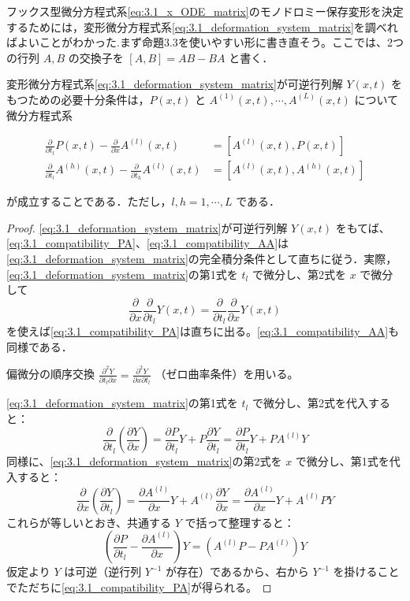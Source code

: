 \begin{story}
フックス型微分方程式系\eqref{eq:3.1_x_ODE_matrix}のモノドロミー保存変形を決定するためには，変形微分方程式系\eqref{eq:3.1_deformation_system_matrix}を調べればよいことがわかった.まず命題3.3を使いやすい形に書き直そう。ここでは、2つの行列 $A, B$ の交換子を $[A, B] = AB - BA$ と書く．

\begin{proposition}\label{prop:3.1_compatibility}
変形微分方程式系\eqref{eq:3.1_deformation_system_matrix}が可逆行列解 $Y(x,t)$ をもつための必要十分条件は，$P(x,t)$ と $A^{(1)}(x,t), \cdots, A^{(L)}(x,t)$ について微分方程式系

\begin{align}
  \frac{\partial}{\partial t_l}P(x,t) - \frac{\partial}{\partial x}A^{(l)}(x,t) &= \left[ A^{(l)}(x,t), P(x,t) \right] \label{eq:3.1_compatibility_PA}\\
  \frac{\partial}{\partial t_l}A^{(h)}(x,t) - \frac{\partial}{\partial t_h}A^{(l)}(x,t) &= \left[ A^{(l)}(x,t), A^{(h)}(x,t) \right] \label{eq:3.1_compatibility_AA}
\end{align}

が成立することである．ただし，$l,h=1,\cdots,L$ である．
\end{proposition}

\begin{proof}
\eqref{eq:3.1_deformation_system_matrix}が可逆行列解 $Y(x,t)$ をもてば、\eqref{eq:3.1_compatibility_PA}、\eqref{eq:3.1_compatibility_AA}は\eqref{eq:3.1_deformation_system_matrix}の完全積分条件として直ちに従う．実際，\eqref{eq:3.1_deformation_system_matrix}の第1式を $t_l$ で微分し、第2式を $x$ で微分して
\[
  \frac{\partial}{\partial x}\frac{\partial}{\partial t_l}Y(x,t) = \frac{\partial}{\partial t_l}\frac{\partial}{\partial x}Y(x,t)
\]
を使えば\eqref{eq:3.1_compatibility_PA}は直ちに出る。\eqref{eq:3.1_compatibility_AA}も同様である．

偏微分の順序交換 $\frac{\partial^2 Y}{\partial t_l \partial x} = \frac{\partial^2 Y}{\partial x \partial t_l}$ （ゼロ曲率条件）を用いる。

\eqref{eq:3.1_deformation_system_matrix}の第1式を $t_l$ で微分し、第2式を代入すると：
\[
  \frac{\partial}{\partial t_l}\left(\frac{\partial Y}{\partial x}\right) 
  = \frac{\partial P}{\partial t_l}Y + P\frac{\partial Y}{\partial t_l} 
  = \frac{\partial P}{\partial t_l}Y + P A^{(l)}Y
\]
同様に、\eqref{eq:3.1_deformation_system_matrix}の第2式を $x$ で微分し、第1式を代入すると：
\[
  \frac{\partial}{\partial x}\left(\frac{\partial Y}{\partial t_l}\right) 
  = \frac{\partial A^{(l)}}{\partial x}Y + A^{(l)}\frac{\partial Y}{\partial x} 
  = \frac{\partial A^{(l)}}{\partial x}Y + A^{(l)} P Y
\]
これらが等しいとおき、共通する $Y$ で括って整理すると：
\[
  \left( \frac{\partial P}{\partial t_l} - \frac{\partial A^{(l)}}{\partial x} \right) Y 
  = \left( A^{(l)} P - P A^{(l)} \right) Y
\]
仮定より $Y$ は可逆（逆行列 $Y^{-1}$ が存在）であるから、右から $Y^{-1}$ を掛けることでただちに\eqref{eq:3.1_compatibility_PA}が得られる。


\end{proof}
\end{story}
